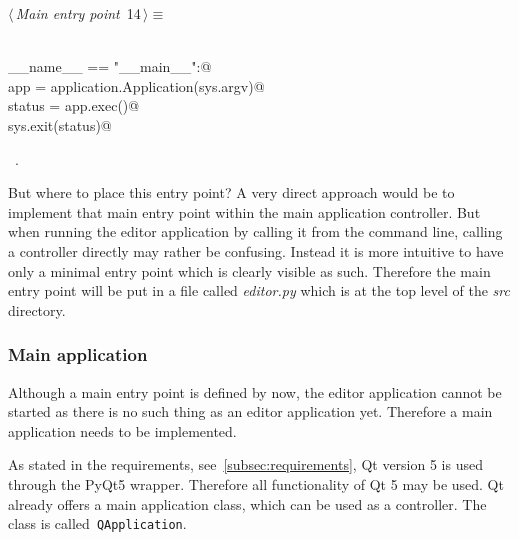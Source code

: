 \documentclass[
    a4paper,      %
    10pt,         %
    openright,    %
    notitlepage,  %
    parskip=half, %
]{scrreprt}       %
\theoremstyle{definition}                    %
\begin{document}
\begin{flushleft} \small
\begin{minipage}{\linewidth}\label{scrap1}\raggedright\small
{} $\langle\,${\itshape Main entry point}\nobreak\ {\footnotesize {14}}$\,\rangle\equiv$
\vspace{-1exm}
\begin{list}{}{} \item
\mbox{}\lstinline@@\\
\mbox{}\lstinline@if __name__ == "__main__":@\\
\mbox{}\lstinline@    app = application.Application(sys.argv)@\\
\mbox{}\lstinline@    status = app.exec()@\\
\mbox{}\lstinline@    sys.exit(status)@\\
\mbox{}\lstinline@@{\NWsep}
\end{list}
\vspace{-1.5ex}
\footnotesize
\begin{list}{}{\setlength{\itemsep}{-\parsep}\setlength{\itemindent}{-\leftmargin}}
\item \NWtxtMacroRefIn\ .

\item{}
\end{list}
\end{minipage}\vspace{4ex}
\end{flushleft}
But where to place this entry point? A very direct approach would be to
implement that main entry point within the main application controller. But when
running the editor application by calling it from the command line, calling a
controller directly may rather be confusing. Instead it is more intuitive to
have only a minimal entry point which is clearly visible as such. Therefore the
main entry point will be put in a file called \textit{editor.py} which is at the
top level of the \textit{src} directory.

\subsubsection{Main application}
\label{ssubsec:main-application}

Although a main entry point is defined by now, the editor application cannot be
started as there is no such thing as an editor application yet. Therefore a main
application needs to be implemented.

As stated in the requirements, see~\autoref{subsec:requirements}, Qt version 5
is used through the PyQt5 wrapper. Therefore all functionality of Qt 5 may be
used. Qt already offers a main application class, which can be used as a
controller. The class is called~\verb+QApplication+.
\end{document}
